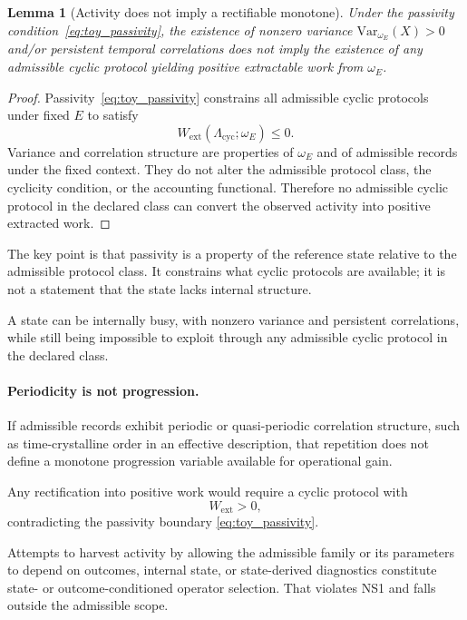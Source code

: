 \documentclass[aps,prx,onecolumn,11pt]{revtex4-2}
\theoremstyle{plain}
\newtheorem{lemma}{Lemma}
\theoremstyle{definition}
\theoremstyle{remark}
\begin{document}
\begin{lemma}[Activity does not imply a rectifiable monotone]
\label{lem:variance_not_leverage}
Under the passivity condition~\eqref{eq:toy_passivity}, the existence
of nonzero variance \(\mathrm{Var}_{\omega_E}(X)>0\) and/or persistent
temporal correlations does not imply the existence of any admissible
cyclic protocol yielding positive extractable work from \(\omega_E\).
\end{lemma}

\begin{proof}
Passivity~\eqref{eq:toy_passivity} constrains all admissible cyclic
protocols under fixed \(E\) to satisfy
\[
W_{\mathrm{ext}}(\Lambda_{\mathrm{cyc}};\omega_E)\leq 0.
\]
Variance and correlation structure are properties of \(\omega_E\) and
of admissible records under the fixed context. They do not alter the
admissible protocol class, the cyclicity condition, or the accounting
functional. Therefore no admissible cyclic protocol in the declared
class can convert the observed activity into positive extracted work.
\qedhere
\end{proof}

The key point is that passivity is a property of the reference state
relative to the admissible protocol class. It constrains what cyclic
protocols are available; it is not a statement that the state lacks
internal structure.

A state can be internally busy, with nonzero variance and persistent
correlations, while still being impossible to exploit through any
admissible cyclic protocol in the declared class.

\paragraph{Periodicity is not progression.}

If admissible records exhibit periodic or quasi-periodic correlation
structure, such as time-crystalline order in an effective description,
that repetition does not define a monotone progression variable
available for operational gain.

Any rectification into positive work would require a cyclic protocol
with
\[
W_{\mathrm{ext}}>0,
\]
contradicting the passivity boundary
\eqref{eq:toy_passivity}.

Attempts to harvest activity by allowing the admissible family or its
parameters to depend on outcomes, internal state, or state-derived
diagnostics constitute state- or outcome-conditioned operator
selection. That violates NS1 and falls outside the admissible scope.
\end{document}
